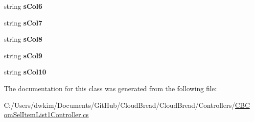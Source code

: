 \begin{DoxyCompactItemize}
\item 
string {\bfseries s\+Col6}\hypertarget{a00149_ab4028b47e436589e8828edd148ff3d2c}{}\label{a00149_ab4028b47e436589e8828edd148ff3d2c}

\item 
string {\bfseries s\+Col7}\hypertarget{a00149_a7d68635e0fd94177f54ac6eedc978fd2}{}\label{a00149_a7d68635e0fd94177f54ac6eedc978fd2}

\item 
string {\bfseries s\+Col8}\hypertarget{a00149_ad775016a811947eb9d8f9ea03cb6f957}{}\label{a00149_ad775016a811947eb9d8f9ea03cb6f957}

\item 
string {\bfseries s\+Col9}\hypertarget{a00149_a6ad00b298ff26eef5696509e63269ac5}{}\label{a00149_a6ad00b298ff26eef5696509e63269ac5}

\item 
string {\bfseries s\+Col10}\hypertarget{a00149_adc53a9c482d3e25637183bb7c4528e44}{}\label{a00149_adc53a9c482d3e25637183bb7c4528e44}

\end{DoxyCompactItemize}


The documentation for this class was generated from the following file\+:\begin{DoxyCompactItemize}
\item 
C\+:/\+Users/dwkim/\+Documents/\+Git\+Hub/\+Cloud\+Bread/\+Cloud\+Bread/\+Controllers/\hyperlink{a00201}{C\+B\+Com\+Sel\+Item\+List1\+Controller.\+cs}\end{DoxyCompactItemize}
